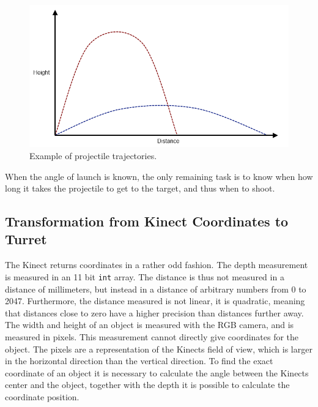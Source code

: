 \begin{figure}[hbtp]
\includegraphics[width=\textwidth]{img/projectile-trajectory-graph.png}
\caption{Example of projectile trajectories.} 
\label{fig:projectile-trajectory} 
\end{figure}

When the angle of launch is known, the only remaining task is to know when how long it takes the projectile to get to the target, and thus when to shoot.

\subsection{Transformation from Kinect Coordinates to Turret}
The Kinect returns coordinates in a rather odd fashion. The depth measurement is measured in an 11 bit \texttt{int} array\cite{kinectdistance}. The distance is thus not measured in a distance of millimeters, but instead in a distance of arbitrary numbers from 0 to 2047. Furthermore, the distance measured is not linear, it is quadratic, meaning that distances close to zero have a higher precision than distances further away.
The width and height of an object is measured with the RGB camera, and is measured in pixels. This measurement cannot directly give coordinates for the object. The pixels are a representation of the Kinects field of  view, which is larger in the horizontal direction than the vertical direction. To find the exact coordinate of an object it is necessary to calculate the angle between the Kinects center and the object, together with the depth it is possible to calculate the coordinate position.